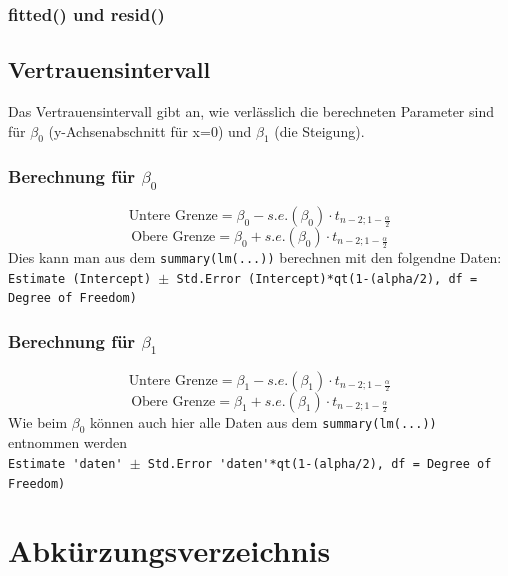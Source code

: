 \subsubsection{fitted() und resid()}



\subsection{Vertrauensintervall}
Das Vertrauensintervall gibt an, wie verlässlich die berechneten Parameter
sind für $\beta_0$ (y-Achsenabschnitt für x=0) und $\beta_1$ (die Steigung).
\subsubsection{Berechnung für $\beta_0$}
\[ \text{Untere Grenze} = \beta_0 - s.e.(\beta_0)\cdot t_{n-2;1-\frac{\alpha}{2}} \]
\[ \text{Obere Grenze} = \beta_0 + s.e.(\beta_0)\cdot t_{n-2;1-\frac{\alpha}{2}} \]
Dies kann man aus dem \verb!summary(lm(...))! berechnen mit den folgendne Daten:\\
\verb!Estimate (Intercept) !$\pm$\verb! Std.Error (Intercept)*qt(1-(alpha/2), df = Degree of Freedom)!
\subsubsection{Berechnung für $\beta_1$}
\[ \text{Untere Grenze} = \beta_1 - s.e.(\beta_1)\cdot t_{n-2;1-\frac{\alpha}{2}} \]
\[ \text{Obere Grenze} = \beta_1 + s.e.(\beta_1)\cdot t_{n-2;1-\frac{\alpha}{2}} \]
Wie beim $\beta_0$ können auch hier alle Daten aus dem 
\verb!summary(lm(...))! entnommen werden\\
\verb!Estimate 'daten' !$\pm$\verb! Std.Error 'daten'*qt(1-(alpha/2), df = Degree of Freedom)!



\section{Abkürzungsverzeichnis}
\begin{acronym}[SQL]
\end{acronym}


